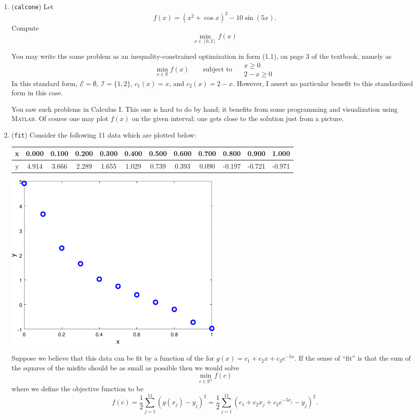 \documentclass[11pt]{amsart}
\newcommand{\RR}{\mathbb{R}}
\newcommand{\Matlab}{\textsc{Matlab}\xspace}
\begin{document}
\bigskip
\renewcommand{\labelenumi}{\Roman{enumi}. \quad}
\begin{enumerate}
\item (\texttt{calcone})  \quad Let
    $$f(x) = \left(x^2 + \cos x\right)^2 - 10 \sin(5 x).$$
Compute
    $$\min_{x\in [0,2]} f(x)$$

You may write the same problem as an inequality-constrained optimization in form (1.1), on page 3 of the textbook, namely as
	$$\min_{x\in\RR} f(x) \qquad \text{subject to }\quad \begin{matrix} x \ge 0 \\ 2 - x \ge 0\end{matrix}$$
In this standard form, $\mathcal{E}=\emptyset$, $\mathcal{I}=\{1,2\}$, $c_1(x)=x$, and $c_2(x)=2-x$.  However, I assert no particular benefit to this standardized form in this case.

You saw such problems in Calculus I.  This one is hard to do by hand; it benefits from some programming and visualization using \Matlab.  Of course one may plot $f(x)$ on the given interval; one gets close to the solution just from a picture.


\medskip
\item (\texttt{fit})  \quad Consider the following 11 data which are plotted below:

\bigskip
\begin{tabular}{c|ccccccccccc}
x & 0.000 & 0.100 & 0.200 & 0.300 & 0.400 & 0.500 & 0.600 & 0.700 &  0.800 &  0.900 &  1.000 \\
\hline
y & 4.914 & 3.666 & 2.289 & 1.655 & 1.029 & 0.739 & 0.393 & 0.090 & -0.197 & -0.721 & -0.971
\end{tabular}

\bigskip
\begin{center}
\includegraphics[width=0.5\textwidth]{fitdata}
\end{center}

\medskip
Suppose we believe that this data can be fit by a function of the for $g(x) = c_1 + c_2 x + c_3 e^{-5 x}$.  If the sense of ``fit'' is that the sum of the squares of the misfits should be as small as possible then we would solve
	$$\min_{c \in \RR^3} f(c)$$
where we define the objective function to be
	$$f(c) = \frac{1}{2} \sum_{j=1}^{11} \left(g(x_j) - y_j\right)^2 = \frac{1}{2} \sum_{j=1}^{11} \left(c_1 + c_2 x_j + c_3 e^{-5 x_j} - y_j\right)^2.$$


\end{enumerate}
\end{document}
